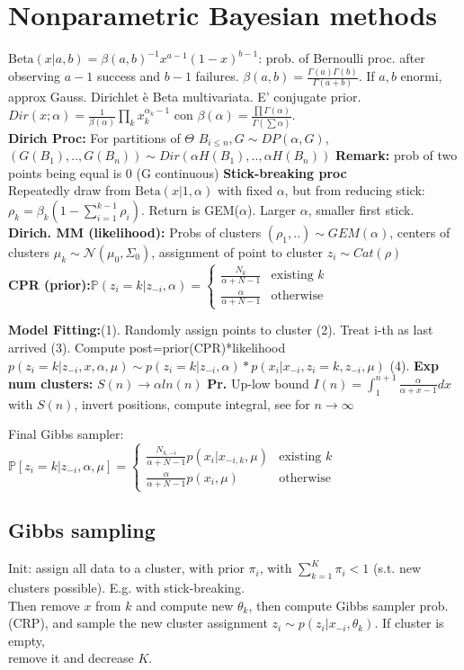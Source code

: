 \section*{Nonparametric Bayesian methods}
$\text{Beta}(x|a,b)=\beta(a,b)^{-1} x^{a-1}(1-x)^{b-1}$: prob. of Bernoulli proc. after observing $a-1$ success and $b-1$ failures. $\beta(a,b)=\frac{\Gamma(a)\Gamma(b)}{\Gamma(a+b)}$. If $a,b$ enormi, approx Gauss.
Dirichlet è Beta multivariata. E' conjugate prior. $Dir(x;\alpha)=\frac{1}{\beta(\alpha)}\prod_k x_k^{\alpha_k-1}$ con $\beta(\alpha)=\frac{\prod\Gamma(\alpha)}{\Gamma(\sum\alpha)}$.\\
\textbf{Dirich Proc:} For partitions of $\Theta$ $B_{i\le n}, G\sim DP(\alpha,G)$, $(G(B_1),..,G(B_n))\sim Dir(\alpha H(B_1),..,\alpha H(B_n))$ \textbf{Remark:} prob of two points being equal is 0 (G continuous)
\textbf{Stick-breaking proc} \\ Repeatedly draw from $\text{Beta}(x|1,\alpha)$ with fixed $\alpha$, but from reducing stick: $\rho_k=\beta_k(1-\sum_{i=1}^{k-1}\rho_i)$. Return is GEM($\alpha$). Larger $\alpha$, smaller first stick.\\
\textbf{Dirich. MM (likelihood):} Probs of clusters $(\rho_1,..)\sim GEM(\alpha)$, centers of clusters $\mu_k\sim\mathcal N(\mu_0,\Sigma_0)$, assignment of point to cluster $z_i\sim Cat(\rho)$\\
\textbf{CPR (prior):}$\mathbb{P}(z_i=k|z_{-i},\alpha)=\begin{cases}\frac{N_k}{\alpha+N-1} & \text{existing }k \\ \frac{\alpha}{\alpha+N-1} & \text{otherwise}\end{cases}$

\textbf{Model Fitting:}(1). Randomly assign points to cluster (2). Treat i-th as last arrived (3). Compute post=prior(CPR)*likelihood $p(z_i=k|z_{-i},x,\alpha,\mu)\sim p(z_i=k|z_{-i},\alpha)*p(x_i|x_{-i},z_i=k,z_{-i},\mu)$ (4).
\textbf{Exp num clusters:} $S(n)\to \alpha ln(n)$ \textbf{Pr.} Up-low bound $I(n)=\int_1^{n+1}\frac{\alpha}{\alpha+x-1}dx$ with $S(n)$, invert positions, compute integral, see for $n\to\infty$

Final Gibbs sampler:\\
$\mathbb{P}[z_i=k|z_{-i},\alpha,\mu]=\begin{cases}\frac{N_{k,-i}}{\alpha+N-1}p(x_i|x_{-i,k},\mu) & \text{existing }k \\ \frac{\alpha}{\alpha+N-1}p(x_i,\mu) & \text{otherwise}\end{cases}$

\subsection*{Gibbs sampling}
Init: assign all data to a cluster, with prior $\pi_i$, with $\sum_{k=1}^K\pi_i<1$ (s.t. new clusters possible). E.g. with stick-breaking. \\
Then remove $x$ from $k$ and compute new $\theta_k$, then compute Gibbs sampler prob. (CRP), and sample the new cluster assignment $z_i\sim p(z_i|x_{-i},\theta_k)$. If cluster is empty, \\
remove it and decrease $K$.